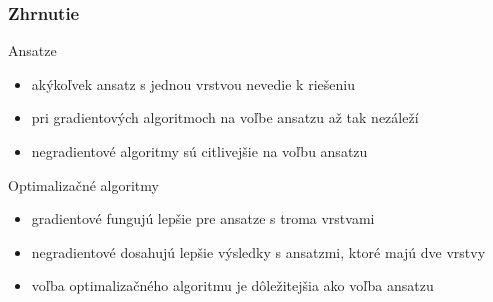 \documentclass{beamer}
\begin{document}
\begin{frame}
    \frametitle{Zhrnutie}
    \begin{block}{Ansatze}
        \begin{itemize}
            \item akýkoľvek ansatz s jednou vrstvou nevedie k riešeniu
            \item pri gradientových algoritmoch na voľbe ansatzu až tak nezáleží
            \item negradientové algoritmy sú citlivejšie na voľbu ansatzu
        \end{itemize}
    \end{block}

    \begin{block}{Optimalizačné algoritmy}
        \begin{itemize}
            \item gradientové fungujú lepšie pre ansatze s troma vrstvami
            \item negradientové dosahujú lepšie výsledky s ansatzmi, ktoré majú dve vrstvy
            \item voľba optimalizačného algoritmu je dôležitejšia ako voľba ansatzu
        \end{itemize}
    \end{block}
	
\end{frame}
\end{document}
